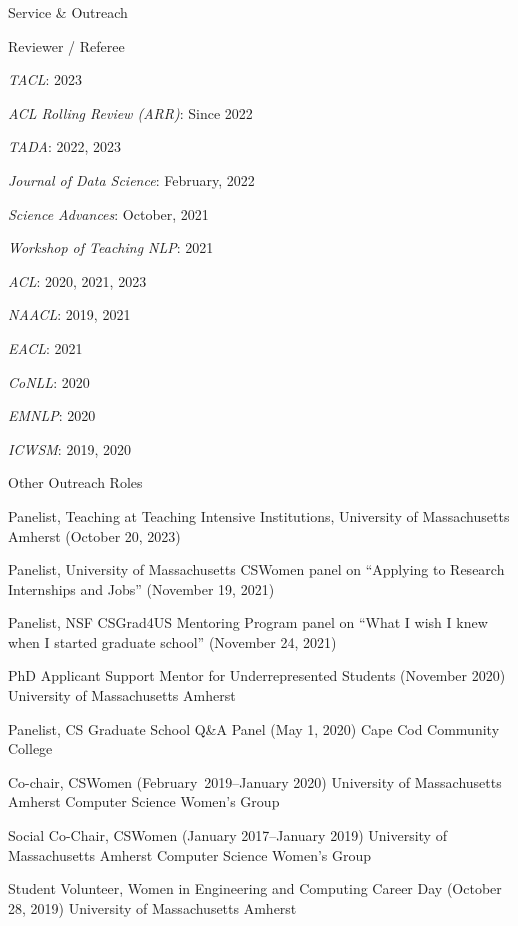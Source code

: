 \documentclass{resume} %
\begin{document}
\begin{rSection}{Service \& Outreach}
\noindent
\begin{rSubsection}{Reviewer / Referee}{}{}{}
\item \emph{TACL}: 2023
\item \emph{ACL Rolling Review (ARR)}: Since 2022
\item \emph{TADA}: 2022, 2023
\item \emph{Journal of Data Science}: February, 2022
\item \emph{Science Advances}: October, 2021
\item \emph{Workshop of Teaching NLP}: 2021
\item \emph{ACL}: 2020, 2021, 2023
\item \emph{NAACL}: 2019, 2021
\item \emph{EACL}: 2021 
\item \emph{CoNLL}: 2020 
\item \emph{EMNLP}: 2020 
\item \emph{ICWSM}: 2019, 2020
\end{rSubsection}

\begin{rSubsection}{Other Outreach Roles}{}{}{}
\item Panelist, Teaching at Teaching Intensive Institutions, University of Massachusetts Amherst (October 20, 2023)
\item Panelist, University of Massachusetts CSWomen panel on ``Applying to Research Internships and Jobs'' (November 19, 2021)
\item Panelist, NSF CSGrad4US Mentoring Program panel on ``What I wish I knew when I started graduate school'' (November 24, 2021)
\item 
{PhD Applicant Support Mentor for Underrepresented Students} ({November 2020}) {University of Massachusetts Amherst}
\item 
{Panelist, CS Graduate School Q\&A Panel} ({May 1, 2020}) {Cape Cod Community College}

\item 
{Co-chair, CSWomen} ({February~2019--January 2020}) {University of Massachusetts Amherst Computer Science Women's Group}

\item 
{Social Co-Chair,  CSWomen} ({January 2017--January 2019}) 
{University of Massachusetts Amherst Computer Science Women's Group}

\item {Student Volunteer, Women in Engineering and Computing Career Day} ({October 28, 2019})
{University of Massachusetts Amherst}{}



\end{rSubsection}
\end{rSection}
\end{document}
